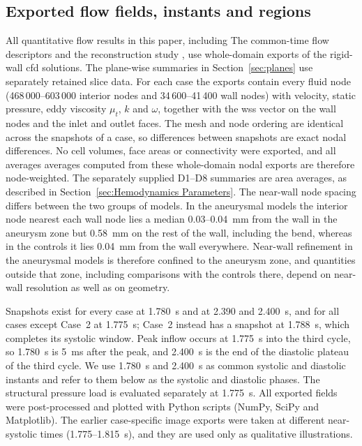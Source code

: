 \documentclass[12pt,a4paper]{article}
\newcommand{\cfdrevision}[1]{#1} %
\newcommand{\CFD}{\ac{cfd}\xspace}
\newcommand{\WSS}{\ac{wss}\xspace}
\theoremstyle{definition}
\numberwithin{equation}{section}
\providecommand{\DIFaddtex}[1]{{\protect\color{blue} \sf #1}} %
\providecommand{\DIFdeltex}[1]{{\protect\color{red} \scriptsize #1}} %
\providecommand{\DIFaddbegin}{} %
\providecommand{\DIFaddend}{} %
\providecommand{\DIFdelbegin}{} %
\providecommand{\DIFdelend}{} %
\providecommand{\DIFadd}[1]{\texorpdfstring{\DIFaddtex{#1}}{#1}} %
\providecommand{\DIFdel}[1]{\texorpdfstring{\DIFdeltex{#1}}{}} %
\newcommand{\DIFscaledelfig}{0.5}
\newlength{\DIFdelgraphicswidth} %
\newlength{\DIFdelgraphicsheight} %
\newcommand{\DIFaddincludegraphics}[2][]{{\color{blue}\fbox{\DIFOincludegraphics[#1]{#2}}}} %
\newcommand{\DIFdelincludegraphics}[2][]{%
\sbox{\DIFdelgraphicsbox}{\DIFOincludegraphics[#1]{#2}}%
\settoboxwidth{\DIFdelgraphicswidth}{\DIFdelgraphicsbox} %
\settoboxtotalheight{\DIFdelgraphicsheight}{\DIFdelgraphicsbox} %
\scalebox{\DIFscaledelfig}{%
\parbox[b]{\DIFdelgraphicswidth}{\usebox{\DIFdelgraphicsbox}\\[-\baselineskip] \rule{\DIFdelgraphicswidth}{0em}}\llap{\resizebox{\DIFdelgraphicswidth}{\DIFdelgraphicsheight}{%
\setlength{\unitlength}{\DIFdelgraphicswidth}%
\begin{picture}(1,1)%
\thicklines\linethickness{2pt} %
{\color[rgb]{1,0,0}\put(0,0){\framebox(1,1){}}}%
{\color[rgb]{1,0,0}\put(0,0){\line( 1,1){1}}}%
{\color[rgb]{1,0,0}\put(0,1){\line(1,-1){1}}}%
\end{picture}%
}\hspace*{3pt}}} %
} %
\DeclareRobustCommand{\DIFaddbegin}{\DIFOaddbegin \let\includegraphics\DIFaddincludegraphics} %
\DeclareRobustCommand{\DIFaddend}{\DIFOaddend \let\includegraphics\DIFOincludegraphics} %
\DeclareRobustCommand{\DIFdelbegin}{\DIFOdelbegin \let\includegraphics\DIFdelincludegraphics} %
\DeclareRobustCommand{\DIFdelend}{\DIFOaddend \let\includegraphics\DIFOincludegraphics} %
\begin{document}
\subsection{Exported flow fields, instants and regions}
\label{sec:exports}
\DIFdelbegin \DIFdel{All quantitative flow results in this paper, including }\DIFdelend \DIFaddbegin \DIFadd{The common-time flow descriptors and }\DIFaddend the reconstruction study \DIFdelbegin \DIFdel{, }\DIFdelend use whole-domain exports of the rigid-wall \CFD solutions. \DIFaddbegin \DIFadd{The plane-wise summaries in Section~\ref{sec:planes} use separately retained slice data. }\DIFaddend For each case the exports contain every fluid node (468\,000--603\,000 interior nodes and 34\,600--41\,400 wall nodes) with velocity, static pressure, eddy viscosity $\mu_t$, $k$ and $\omega$, together with the \WSS vector on the wall nodes and the inlet and outlet faces. The mesh and node ordering are identical across the snapshots of a case, so differences between snapshots are exact nodal differences. No cell volumes, face areas or connectivity were exported, and \DIFdelbegin \DIFdel{all averages }\DIFdelend \DIFaddbegin \DIFadd{\cfdrevision{averages computed from these whole-domain nodal exports} }\DIFaddend are therefore node-weighted. \DIFaddbegin \DIFadd{\cfdrevision{The separately supplied D1--D8 summaries are area averages, as described in Section~\ref{sec:Hemodynamics Parameters}.} }\DIFaddend The near-wall node spacing differs between the two groups of models. In the aneurysmal models the interior node nearest each wall node lies a median 0.03--0.04~mm from the wall in the aneurysm zone but 0.58~mm on the rest of the wall, including the bend, whereas in the controls it lies 0.04~mm from the wall everywhere. Near-wall refinement in the aneurysmal models is therefore confined to the aneurysm zone, and quantities outside that zone, including comparisons with the controls there, depend on near-wall resolution as well as on geometry.

Snapshots exist for every case at 1.780~s and at 2.390 and 2.400~s, and for all cases except Case~2 at 1.775~s; Case~2 instead has a snapshot at 1.788~s, which completes its systolic window. Peak inflow occurs at 1.775~s into the third cycle, so 1.780~s is 5~ms after the peak, and 2.400~s is the end of the diastolic plateau of the third cycle. We use 1.780~s and 2.400~s as common systolic and diastolic instants and refer to them below as the systolic and diastolic phases. \DIFaddbegin \DIFadd{\cfdrevision{The structural pressure load is evaluated separately at 1.775~s.} }\DIFaddend All exported fields were post-processed and plotted with Python scripts (NumPy, SciPy and Matplotlib). The earlier case-specific image exports were taken at different near-systolic times (1.775--1.815~s), and they are used only as qualitative illustrations.
\end{document}
